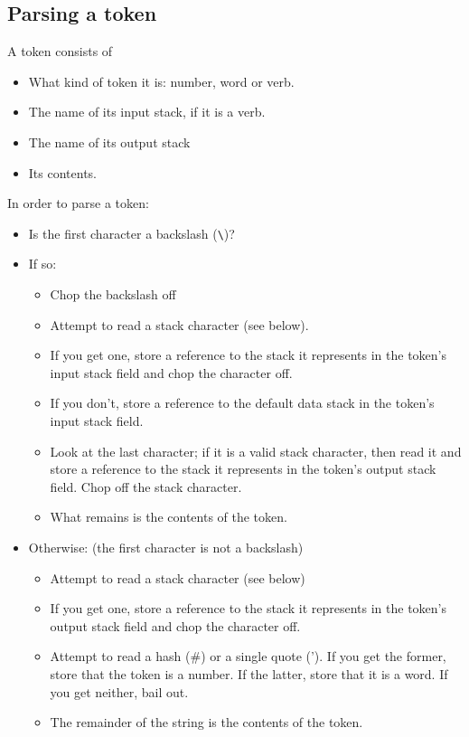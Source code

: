 \documentclass{article}
\begin{document}
{{{{{\subsection{Parsing a token}

A token consists of

\begin{itemize}
\item What kind of token it is: number, word or verb.
\item The name of its input stack, if it is a verb.
\item The name of its output stack
\item Its contents.
\end{itemize}

\noindent In order to parse a token:

\begin{itemize}
\item Is the first character a backslash ({\tt \textbackslash})?
\item If so:
\begin{itemize}
\item Chop the backslash off
\item Attempt to read a stack character (see below).
\item If you get one, store a reference to the stack it represents in the token's input stack field and chop the character off.
\item If you don't, store a reference to the default data stack in the token's input stack field.
\item Look at the last character; if it is a valid stack character, then read it and store a reference to the stack it represents in the token's output stack field.  Chop off the stack character.
\item What remains is the contents of the token.
\end{itemize}

\item Otherwise: (the first character is not a backslash)
\begin{itemize}
\item Attempt to read a stack character (see below)
\item If you get one, store a reference to the stack it represents in the token's output stack field and chop the character off.
\item Attempt to read a hash (\#) or a single quote (').  If you get the former, store that the token is a number.  If the latter, store that it is a word.  If you get neither, bail out.
\item The remainder of the string is the contents of the token.
\end{itemize}
\end{itemize}

}}}}}
\end{document}

